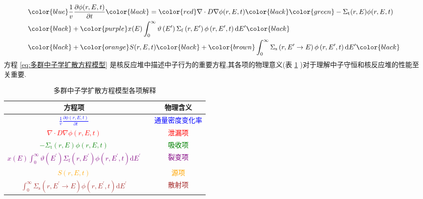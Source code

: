 \documentclass{Sichuan Normal University}
\begin{document}
\begin{equation}
    \begin{aligned}
    & \color{blue}\frac{1}{v} \frac{\partial \phi(r, E, t)}{\partial t} \color{black}= \color{red}\nabla \cdot D \nabla \phi(r, E, t) \color{black} \color{green}- \Sigma_{\mathrm{t}}(r, E) \phi(r, E, t)\\
    & \color{black}+ \color{purple}x(E) \int_0^{\infty} \vartheta\left(E^{\prime}\right) \Sigma_{\mathrm{f}}\left(r, E^{\prime}\right) \phi\left(r, E^{\prime}, t\right) \mathrm{d} E^{\prime} \color{black} \\
    & \color{black}+\color{orange} S(r, E, t) \color{black}+ \color{brown}\int_0^{\infty} \Sigma_{\mathrm{s}}\left(r, E^{\prime} \rightarrow E\right) \phi\left(r, E^{\prime}, t\right) \mathrm{d} E^{\prime} \color{black}
    \end{aligned}
    \label{eq:多群中子学扩散方程模型}
    \end{equation}
方程 \eqref{eq:多群中子学扩散方程模型} 是核反应堆中描述中子行为的重要方程,其各项的物理意义(表 \ref{tab:terms_explanation} )对于理解中子守恒和核反应堆的性能至关重要.
\begin{table}[H]
    \caption{多群中子学扩散方程模型各项解释}
    \centering
    \begin{tabular}{ccc}
    \toprule
    \textbf{方程项} && \textbf{物理含义} \\    
    \midrule
    \textcolor{blue}{\(\frac{1}{v} \frac{\partial \phi(r, E, t)}{\partial t}\)} && \textcolor{blue}{通量密度变化率} \\
    \textcolor{red}{\(\nabla \cdot D \nabla \phi(r, E, t)\)} &&  \textcolor{red}{泄漏项} \\
    \textcolor{green}{\(- \Sigma_{\mathrm{t}}(r, E) \phi(r, E, t)\)} &&  \textcolor{green}{吸收项} \\
    \textcolor{purple}{\(x(E) \int_0^{\infty} \vartheta\left(E^{\prime}\right) \Sigma_{\mathrm{f}}\left(r, E^{\prime}\right) \phi\left(r, E^{\prime}, t\right) \mathrm{d} E^{\prime}\)} && \textcolor{purple}{裂变项} \\
    \textcolor{orange}{\(S(r, E, t)\)} && \textcolor{orange}{源项} \\
    \textcolor{brown}{\(\int_0^{\infty} \Sigma_{\mathrm{s}}\left(r, E^{\prime} \rightarrow E\right) \phi\left(r, E^{\prime}, t\right) \mathrm{d} E^{\prime}\)} && \textcolor{brown}{散射项} \\
    \bottomrule
    \end{tabular}
    \label{tab:terms_explanation}
    \end{table}
\end{document}
